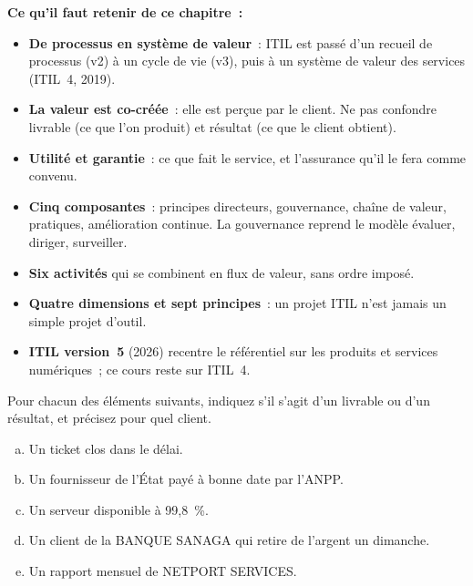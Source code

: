 \separateur

\begin{boxresume}
\textbf{Ce qu'il faut retenir de ce chapitre~:}
\begin{itemize}
    \item \textbf{De processus en système de valeur}~: ITIL est passé d'un
          recueil de processus (v2) à un cycle de vie (v3), puis à un
          système de valeur des services (ITIL~4, 2019).
    \item \textbf{La valeur est co-créée}~: elle est perçue par le client.
          Ne pas confondre livrable (ce que l'on produit) et résultat (ce
          que le client obtient).
    \item \textbf{Utilité et garantie}~: ce que fait le service, et
          l'assurance qu'il le fera comme convenu.
    \item \textbf{Cinq composantes}~: principes directeurs, gouvernance,
          chaîne de valeur, pratiques, amélioration continue. La
          gouvernance reprend le modèle évaluer, diriger, surveiller.
    \item \textbf{Six activités} qui se combinent en flux de valeur, sans
          ordre imposé.
    \item \textbf{Quatre dimensions et sept principes}~: un projet ITIL n'est
          jamais un simple projet d'outil.
    \item \textbf{ITIL version~5} (2026) recentre le référentiel sur les
          produits et services numériques~; ce cours reste sur ITIL~4.
\end{itemize}
\end{boxresume}

\bigskip

\begin{boxexo}[title={\ding{45}\quad Exercice~12.1. Livrable ou résultat~? \niveaubase}]
Pour chacun des éléments suivants, indiquez s'il s'agit d'un livrable ou
d'un résultat, et précisez pour quel client.
\begin{enumerate}[(a)]
    \item Un ticket clos dans le délai.
    \item Un fournisseur de l'État payé à bonne date par l'ANPP.
    \item Un serveur disponible à 99,8~\%.
    \item Un client de la BANQUE SANAGA qui retire de l'argent un dimanche.
    \item Un rapport mensuel de NETPORT SERVICES.
\end{enumerate}
\end{boxexo}

